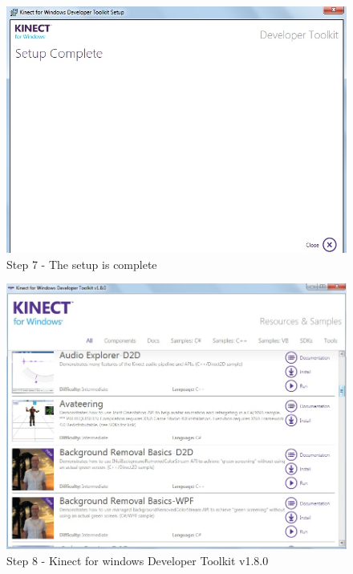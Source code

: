 \begin{flushleft}
\medskip
\begin{figure}
\begin{center}
\includegraphics[scale=0.7]{toolkit_step3}
\end{center}
\caption{Step 7 - The setup is complete}
\label{fig:w8}
\end{figure}

\medskip
\begin{figure}
\begin{center}
\includegraphics[scale=0.7]{after_install}
\end{center}
\caption{Step 8 - Kinect for windows Developer Toolkit v1.8.0}
\label{fig:w9}
\end{figure}


\end{flushleft}
